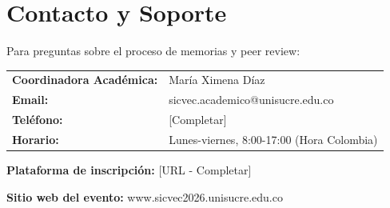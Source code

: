 \documentclass[12pt,a4paper]{article}
\begin{document}
\section{Contacto y Soporte}

Para preguntas sobre el proceso de memorias y peer review:

\vspace{0.8cm}

\begin{center}
\begin{tabular}{ll}
\textbf{Coordinadora Académica:} & María Ximena Díaz \\
\textbf{Email:} & sicvec.academico@unisucre.edu.co \\
\textbf{Teléfono:} & [Completar] \\
\textbf{Horario:} & Lunes-viernes, 8:00-17:00 (Hora Colombia) \\
\end{tabular}
\end{center}

\vspace{1cm}

\textbf{Plataforma de inscripción:} [URL - Completar]

\textbf{Sitio web del evento:} www.sicvec2026.unisucre.edu.co
\end{document}
